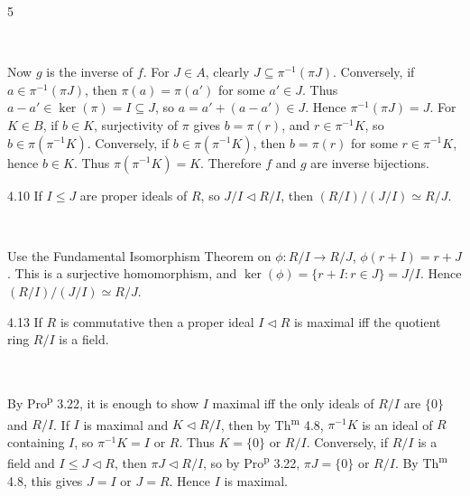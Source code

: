 \documentclass[8pt]{extarticle}
\makeatletter
\renewenvironment{proof}[1][\proofname]{%
  \par\noindent
  \pushQED{\qed}%
  \normalfont\itshape #1\@addpunct{.}\ \normalfont\ignorespaces
}{%
  \popQED%
  \par
}
\makeatother
\begin{document}
\begin{multicols}{5}
\begin{proof}
            Now \(g\) is the inverse of \(f\). For \(J\in A\), clearly \(J\subseteq\pi^{-1}(\pi J)\). Conversely, if \(a\in\pi^{-1}(\pi J)\), then \(\pi(a)=\pi(a')\) for some \(a'\in J\). Thus \(a-a'\in\ker(\pi)=I\subseteq J\), so \(a=a'+(a-a')\in J\). Hence \(\pi^{-1}(\pi J)=J\). For \(K\in B\), if \(b\in K\), surjectivity of \(\pi\) gives \(b=\pi(r)\), and \(r\in\pi^{-1}K\), so \(b\in\pi(\pi^{-1}K)\). Conversely, if \(b\in\pi(\pi^{-1}K)\), then \(b=\pi(r)\) for some \(r\in\pi^{-1}K\), hence \(b\in K\). Thus \(\pi(\pi^{-1}K)=K\). Therefore \(f\) and \(g\) are inverse bijections.
        \end{proof}

        \begin{theorem}{4.10}
            If \(I\le J\) are proper ideals of \(R\), so \(J/I\lhd R/I\), then \((R/I)/(J/I)\simeq R/J\).
        \end{theorem}

        \begin{proof}
            Use the Fundamental Isomorphism Theorem on \(\phi:R/I\to R/J\), \(\phi(r+I)=r+J\). This is a surjective homomorphism, and \(\ker(\phi)=\{r+I:r\in J\}=J/I\). Hence \((R/I)/(J/I)\simeq R/J\).
        \end{proof}

        \begin{center}
            \vspace{-3pt}
            \vspace{-7pt}
        \end{center}

        \begin{corollary}{4.13}
            If \(R\) is commutative then a proper ideal \(I\lhd R\) is maximal iff the quotient ring \(R/I\) is a field.
        \end{corollary}

        \begin{proof}
            By Pro\textsuperscript{p} 3.22, it is enough to show \(I\) maximal iff the only ideals of \(R/I\) are \(\{0\}\) and \(R/I\). If \(I\) is maximal and \(K\lhd R/I\), then by Th\textsuperscript{m} 4.8, \(\pi^{-1}K\) is an ideal of \(R\) containing \(I\), so \(\pi^{-1}K=I\) or \(R\). Thus \(K=\{0\}\) or \(R/I\). Conversely, if \(R/I\) is a field and \(I\le J\lhd R\), then \(\pi J\lhd R/I\), so by Pro\textsuperscript{p} 3.22, \(\pi J=\{0\}\) or \(R/I\). By Th\textsuperscript{m} 4.8, this gives \(J=I\) or \(J=R\). Hence \(I\) is maximal.
        \end{proof}


\end{multicols}
\end{document}
